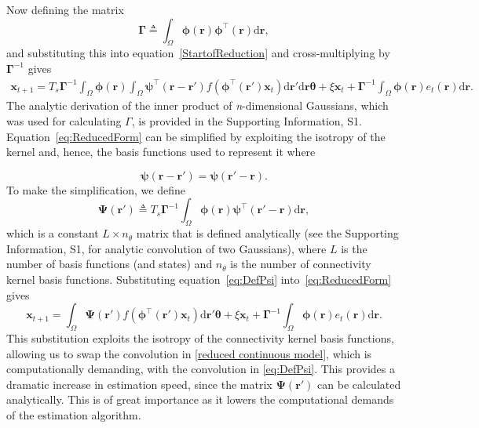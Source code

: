 \documentclass[10pt]{article}
\begin{document}
Now defining the matrix
\begin{equation}\label{eq:DefGamma}
	\boldsymbol{\Gamma} \triangleq \int_\Omega {\boldsymbol{\phi} \left(\mathbf{r}\right)\boldsymbol{\phi} ^{\top}\left(\mathbf{r}\right)\textrm{d}\mathbf{r}}, 
\end{equation}
and substituting this into equation~\ref{StartofReduction} and cross-multiplying by $\boldsymbol{\Gamma}^{-1}$ gives 
\begin{equation}
    \label{eq:ReducedForm}
    \begin{split}
	 \mathbf{x}_{t+1} = T_s\boldsymbol{\Gamma}^{-1}
	 \int_\Omega \boldsymbol{\phi}(\mathbf{r}) 
	 \int_\Omega \boldsymbol{\psi}^{\top} (\mathbf{r}-\mathbf{r}')f(\boldsymbol{\phi}^{\top}(\mathbf{r}')\mathbf{x}_t) \textrm{d}\mathbf{r}' \textrm{d}\mathbf{r} \boldsymbol{\theta}  
	 + \xi\mathbf{x}_t + \boldsymbol{\Gamma}^{-1} \int_\Omega{\boldsymbol{\phi}(\mathbf{r}) e_t(\mathbf{r})\textrm{d}\mathbf{r}}.
	 \end{split}
\end{equation}
The analytic derivation of the inner product of \emph{n}-dimensional Gaussians, which was used for calculating $\Gamma$, is provided in the Supporting Information, S1. Equation~\ref{eq:ReducedForm} can be simplified by exploiting the isotropy of the kernel and, hence, the basis functions used to represent it where

\begin{equation}
	\boldsymbol{\psi} (\mathbf{r}-\mathbf{r}') = \boldsymbol{\psi} (\mathbf{r}'-\mathbf{r}).
\end{equation}
To make the simplification, we define
\begin{equation}\label{eq:DefPsi}
	\boldsymbol{\Psi}(\mathbf{r}') \triangleq T_s\boldsymbol{\Gamma}^{-1}\int_\Omega {\boldsymbol{\phi}(\mathbf{r})\boldsymbol{\psi}^{\top} (\mathbf{r}'-\mathbf{r})\textrm{d}\mathbf{r}},
\end{equation}
which is a constant $L \times n_{\theta}$ matrix that is defined analytically (see the Supporting Information, S1, for analytic convolution of two Gaussians), where $L$ is the number of basis functions (and states) and $n_{\theta}$ is the number of connectivity kernel basis functions. Substituting equation~\ref{eq:DefPsi} into~\ref{eq:ReducedForm} gives
\begin{equation}
	\mathbf{x}_{t+1} = \int_\Omega \boldsymbol{\Psi}(\mathbf{r}') f(\boldsymbol{\phi}^{\top}(\mathbf{r}')\mathbf{x}_t) \textrm{d}\mathbf{r}' \boldsymbol{\theta} + \xi\mathbf{x}_t 
+ \boldsymbol{\Gamma}^{-1} \int_\Omega{\boldsymbol{\phi}(\mathbf{r})e_t(\mathbf{r})\textrm{d}\mathbf{r}}.
\end{equation}
This substitution exploits the isotropy of the connectivity kernel basis functions, allowing us to swap the convolution in \ref{reduced continuous model}, which is computationally demanding, with the convolution in \ref{eq:DefPsi}. This provides a dramatic increase in estimation speed, since the matrix $\boldsymbol\Psi(\mathbf{r}')$ can be calculated analytically. This is of great importance as it lowers the computational demands of the estimation algorithm. 
\end{document}
